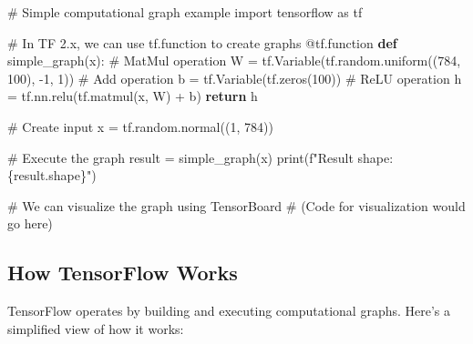 \documentclass[
  letterpaper,
  DIV=11,
  numbers=noendperiod]{scrreprt}
\newenvironment{Shaded}{\begin{snugshade}}{\end{snugshade}}
\newcommand{\AttributeTok}[1]{\textcolor[rgb]{0.40,0.45,0.13}{#1}}
\newcommand{\BuiltInTok}[1]{\textcolor[rgb]{0.00,0.23,0.31}{#1}}
\newcommand{\CommentTok}[1]{\textcolor[rgb]{0.37,0.37,0.37}{#1}}
\newcommand{\ControlFlowTok}[1]{\textcolor[rgb]{0.00,0.23,0.31}{\textbf{#1}}}
\newcommand{\DecValTok}[1]{\textcolor[rgb]{0.68,0.00,0.00}{#1}}
\newcommand{\ImportTok}[1]{\textcolor[rgb]{0.00,0.46,0.62}{#1}}
\newcommand{\KeywordTok}[1]{\textcolor[rgb]{0.00,0.23,0.31}{\textbf{#1}}}
\newcommand{\NormalTok}[1]{\textcolor[rgb]{0.00,0.23,0.31}{#1}}
\newcommand{\OperatorTok}[1]{\textcolor[rgb]{0.37,0.37,0.37}{#1}}
\newcommand{\SpecialCharTok}[1]{\textcolor[rgb]{0.37,0.37,0.37}{#1}}
\newcommand{\SpecialStringTok}[1]{\textcolor[rgb]{0.13,0.47,0.30}{#1}}
\begin{document}
\begin{Shaded}
\begin{Highlighting}[]
\CommentTok{\# Simple computational graph example}
\ImportTok{import}\NormalTok{ tensorflow }\ImportTok{as}\NormalTok{ tf}

\CommentTok{\# In TF 2.x, we can use tf.function to create graphs}
\AttributeTok{@tf.function}
\KeywordTok{def}\NormalTok{ simple\_graph(x):}
    \CommentTok{\# MatMul operation}
\NormalTok{    W }\OperatorTok{=}\NormalTok{ tf.Variable(tf.random.uniform((}\DecValTok{784}\NormalTok{, }\DecValTok{100}\NormalTok{), }\OperatorTok{{-}}\DecValTok{1}\NormalTok{, }\DecValTok{1}\NormalTok{))}
    \CommentTok{\# Add operation}
\NormalTok{    b }\OperatorTok{=}\NormalTok{ tf.Variable(tf.zeros(}\DecValTok{100}\NormalTok{))}
    \CommentTok{\# ReLU operation}
\NormalTok{    h }\OperatorTok{=}\NormalTok{ tf.nn.relu(tf.matmul(x, W) }\OperatorTok{+}\NormalTok{ b)}
    \ControlFlowTok{return}\NormalTok{ h}

\CommentTok{\# Create input}
\NormalTok{x }\OperatorTok{=}\NormalTok{ tf.random.normal((}\DecValTok{1}\NormalTok{, }\DecValTok{784}\NormalTok{))}

\CommentTok{\# Execute the graph}
\NormalTok{result }\OperatorTok{=}\NormalTok{ simple\_graph(x)}
\BuiltInTok{print}\NormalTok{(}\SpecialStringTok{f"Result shape: }\SpecialCharTok{\{}\NormalTok{result}\SpecialCharTok{.}\NormalTok{shape}\SpecialCharTok{\}}\SpecialStringTok{"}\NormalTok{)}

\CommentTok{\# We can visualize the graph using TensorBoard}
\CommentTok{\# (Code for visualization would go here)}
\end{Highlighting}
\end{Shaded}

\subsection{How TensorFlow Works}\label{how-tensorflow-works}

TensorFlow operates by building and executing computational graphs.
Here's a simplified view of how it works:
\end{document}
